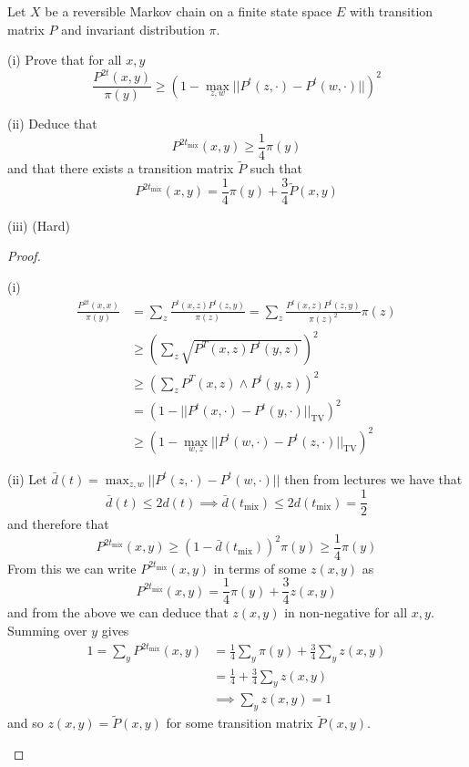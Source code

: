 \documentclass[a4paper]{article}
\begin{document}
	\begin{question}[Question 6]
	Let $X$ be a reversible Markov chain on a finite state space $E$ with transition matrix $P$ and invariant distribution $\pi$.
	\begin{description}
	\item (i) Prove that for all $x, y$
	\[ \frac{P^{2t}(x,y)}{\pi (y)} \geq \left(1 - \max_{z,w}{||P^t(z, \cdot) - P^t(w, \cdot)||} \right)^2 \]
	\item (ii) Deduce that
	\[ P^{2t_{\text{mix}}}(x,y) \geq \frac{1}{4} \pi (y) \]
	and that there exists a transition matrix $\tilde{P}$ such that
	\[ P^{2t_{\text{mix}}}(x,y) = \frac{1}{4}\pi (y) + \frac{3}{4}  \tilde{P}(x,y)\]
	\item (iii) (Hard)
	\end{description}
	\end{question}
	\begin{proof}
	\begin{description}
	\item (i)
	\begin{align*}
	\frac{P^{2t}(x,x)}{\pi (y)} &= \sum_{z} \frac{P^t(x,z)P^t(z,y)}{\pi (z)} = \sum_{z} \frac{P^t(x,z)P^t(z,y)}{\pi (z)^2} \pi (z)\\
	&\geq \left( \sum_{z} \sqrt{P^T(x,z)P^t(y,z)} \right)^2\\
	&\geq \left( \sum_{z} P^T(x,z) \wedge P^t(y,z) \right)^2\\
	&= (1 - || P^t(x, \cdot) - P^t(y, \cdot ) ||_{\text{TV}})^2\\
	&\geq (1 - \max_{w,z} || P^t(w, \cdot) - P^t(z, \cdot ) ||_{\text{TV}})^2
	\end{align*}
	\item (ii) Let $\bar{d}(t) = \max_{z,w}{||P^t(z, \cdot) - P^t(w, \cdot)||}$ then from lectures we have that
	\[\bar{d}(t) \leq 2 d(t) \implies \bar{d}(t_{\text{mix}}) \leq 2 d(t_{\text{mix}}) = \frac{1}{2}\]
	and therefore that
	\[P^{2t_{\text{mix}}}(x,y) \geq (1-\bar{d}(t_{\text{mix}}))^2 \pi (y) \geq \frac{1}{4} \pi (y)\]
	From this we can write $P^{2t_{\text{mix}}}(x,y)$ in terms of some $z(x,y)$ as
	\[ P^{2t_{\text{mix}}}(x,y) = \frac{1}{4} \pi (y) + \frac{3}{4} z(x,y) \]
	and from the above we can deduce that $z(x,y)$ in non-negative for all $x,y$. Summing over $y$ gives
	\begin{align*}
	1 = \sum_{y}{P^{2t_{\text{mix}}}(x,y)} &= \frac{1}{4} \sum_{y}\pi (y) + \frac{3}{4} \sum_{y} z(x,y)\\
	&=\frac{1}{4} + \frac{3}{4} \sum_{y} z(x,y)\\
	&\implies \sum_{y} z(x,y) = 1
	\end{align*}
	and so $z(x,y) = \tilde{P}(x,y)$ for some transition matrix $\tilde{P}(x,y)$.
	
	\end{description}
	\end{proof}
\end{document}

